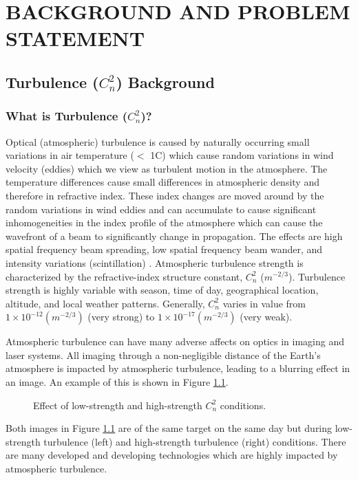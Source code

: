 \chapter{BACKGROUND AND PROBLEM STATEMENT}
\label{ch1}

\section{Turbulence ($C_{n}^{2}$) Background}
\subsection{What is Turbulence ($C_{n}^{2}$)?}
Optical (atmospheric) turbulence is caused by naturally occurring small variations in air temperature ($<$ 1\textdegree C) which cause random variations in wind velocity (eddies) which we view as turbulent motion in the atmosphere. The temperature differences cause small differences in atmospheric density and therefore in refractive index. These index changes are moved around by the random variations in wind eddies and can accumulate to cause significant inhomogeneities in the index profile of the atmosphere which can cause the wavefront of a beam to significantly change in propagation. The effects are high spatial frequency beam spreading, low spatial frequency beam wander, and intensity variations (scintillation) \cite{tyson2011principles}. Atmospheric turbulence strength is characterized by the refractive-index structure constant, $C_{n}^{2}$ ($m^{-2/3}$). Turbulence strength is highly variable with season, time of day, geographical location, altitude, and local weather patterns. Generally, $C_{n}^{2}$ varies in value from $1 \times 10^{-12} (m^{-2/3})$ (very strong) to $1 \times 10^{-17} (m^{-2/3})$ (very weak).

Atmospheric turbulence can have many adverse affects on optics in imaging and laser systems. All imaging through a non-negligible distance of the Earth's atmosphere is impacted by atmospheric turbulence, leading to a blurring effect in an image. An example of this is shown in Figure \ref{fig:first_frames}.
\begin{figure}[h!]
	\centering
	\hfill
	\caption{Effect of low-strength and high-strength $C_{n}^{2}$ conditions.}
	\label{fig:first_frames}
\end{figure}
Both images in Figure \ref{fig:first_frames} are of the same target on the same day but during low-strength turbulence (left) and high-strength turbulence (right) conditions. There are many developed and developing technologies which are highly impacted by atmospheric turbulence.

